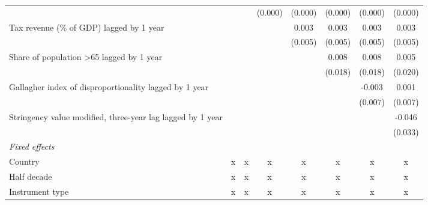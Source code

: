 \begin{tabular}{lccccccc}
                                                                                   &         &               & (0.000)       & (0.000)       & (0.000)       & (0.000)       & (0.000)\\   
   Tax revenue (\% of GDP) lagged by 1 year                                        &         &               &               & 0.003         & 0.003         & 0.003         & 0.003\\   
                                                                                   &         &               &               & (0.005)       & (0.005)       & (0.005)       & (0.005)\\   
   Share of population >65 lagged by 1 year                                        &         &               &               &               & 0.008         & 0.008         & 0.005\\   
                                                                                   &         &               &               &               & (0.018)       & (0.018)       & (0.020)\\   
   Gallagher index of disproportionality lagged by 1 year                          &         &               &               &               &               & -0.003        & 0.001\\   
                                                                                   &         &               &               &               &               & (0.007)       & (0.007)\\   
   Stringency value modified, three-year lag lagged by 1 year                      &         &               &               &               &               &               & -0.046\\   
                                                                                   &         &               &               &               &               &               & (0.033)\\   
   \emph{Fixed effects}\\
   Country                                                                         & x       & x             & x             & x             & x             & x             & x\\  
   Half decade                                                                     & x       & x             & x             & x             & x             & x             & x\\  
   Instrument type                                                                 & x       & x             & x             & x             & x             & x             & x\\  

\end{tabular}
